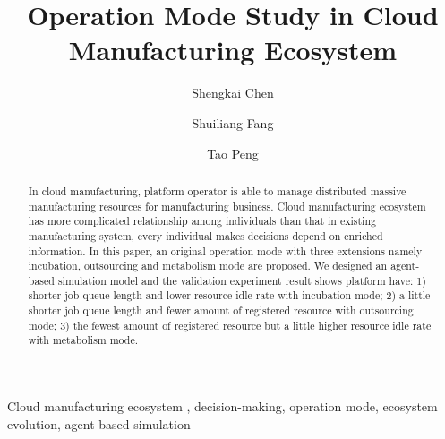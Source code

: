 
\title{Operation Mode Study in Cloud Manufacturing Ecosystem
}

\author[add1]{Shengkai Chen}
\author[add2,add1]{Shuiliang Fang}
\author[add2,add1]{Tao Peng}
\address[add2]{The State Key Laboratory of Fluid Power Transmission and Control, College of Mechanical Engineering, Zhejiang University, Hangzhou, 310027, China}
\address[add1]{Key Laboratory of Advanced Manufacturing Technology of Zhejiang Province, College of Mechanical Engineering, Zhejiang University, Hangzhou , 310027, China}



\begin{abstract}
In cloud manufacturing, platform operator is able to manage distributed massive manufacturing resources for manufacturing business.
Cloud manufacturing ecosystem has more complicated relationship among individuals than that in existing manufacturing system, every individual makes decisions depend on enriched information. In this paper, an original operation mode with three extensions namely incubation, outsourcing and metabolism mode are proposed. We designed an agent-based simulation model and the validation experiment result shows platform have: 1) shorter job queue length and lower resource idle rate with incubation mode; 2) a little shorter job queue length and fewer amount of registered resource with outsourcing mode; 3) the fewest amount of registered resource but a little higher resource idle rate with metabolism mode.


\end{abstract}

\begin{keyword}
Cloud manufacturing ecosystem \sep
decision-making\sep
operation mode\sep
ecosystem evolution\sep
agent-based simulation

\end{keyword}
